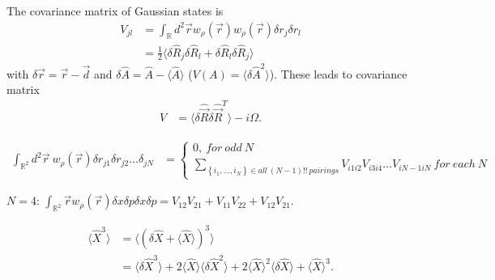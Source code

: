 \documentclass[../../note.tex]{subfiles}
\begin{document}
\begin{lemma}
    The covariance matrix of Gaussian states is
    \begin{align}
        V_{jl}
        &= \int_{\mathbb{R}} d^2 \overrightarrow{r} w_{\rho}(\overrightarrow{r}) w_{\rho}(\overrightarrow{r}) \delta r_j \delta r_l \\
        &= \frac{1}{2} \langle \delta \hat{R}_j \delta \hat{R}_l + \delta \hat{R}_l \delta \hat{R}_j \rangle 
    \end{align}
    with $\delta \overrightarrow{r} = \overrightarrow{r} - \overrightarrow{d}$ and $\delta \hat{A} = \hat{A} - \langle \hat{A} \rangle$ ($V(A) = \langle \delta \hat{A}^2 \rangle$). These leads to covariance matrix 
    \begin{align}
        V
        &= \langle \delta \hat{\overrightarrow{R}} \delta \hat{\overrightarrow{R}}^T \rangle - i \Omega.
    \end{align}
\end{lemma}

\begin{theorem}
    \begin{align}
        \int_{\mathbb{R}^2} d^2 \overrightarrow{r}~w_{\rho}(\overrightarrow{r}) \delta r_{j1} \delta r_{j2} \dots \delta_{jN}
        &= 
        \left\{\begin{matrix}
            0,~for~odd~N \\
            \sum_{\left\{i_1,..., i_N\right\} \in all~(N-1)!!~pairings} V_{i1 i2} V_{i3 i4} \dots V_{i{N-1} i{N}}~for~each~N
        \end{matrix}
        \right.
    \end{align}
\end{theorem}

\begin{example}
    $N=4$: $\int_{\mathbb{R}^2} \overrightarrow{r} w_{\rho}(\overrightarrow{r}) \delta x \delta p \delta x \delta p = V_{12} V_{21} + V_{11} V_{22} + V_{12}V_{21}$.
\end{example}

\begin{example}
    \begin{align}
        \langle \hat{X}^3 \rangle
        &= \langle (\delta \hat{X} + \langle \hat{X} \rangle)^3 \rangle \\
        &= \langle \delta \hat{X}^3 \rangle + 2 \langle \hat{X} \rangle \langle \delta \hat{X}^2 \rangle + 2 \langle \hat{X} \rangle^2 \langle \delta \hat{X} \rangle + \langle \hat{X} \rangle^3.
    \end{align}
\end{example}
\end{document}
